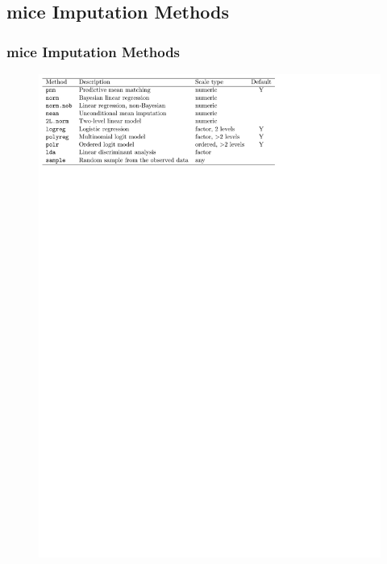 \documentclass[UKenglish
  pdftex                    %
  dvipsnames                %
]{beamer}
\newcommand{\pk}[1]{\textcolor{Rblue}{\textsf{#1}}}
\begin{document}
\subsection{\pk{mice} Imputation Methods}
\begin{frame}\frametitle{\pk{mice} Imputation Methods}

\begin{figure}
  \centering
  \includegraphics[width=\textwidth]{./Figures/methods.pdf}
\end{figure}

\end{frame}
\end{document}
